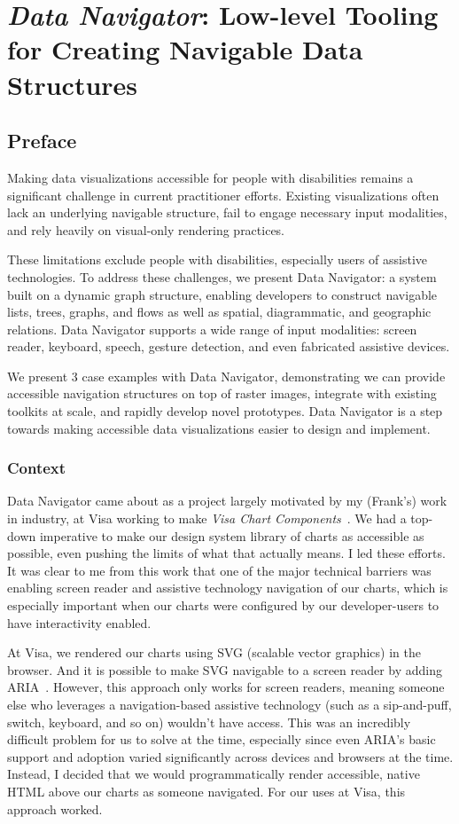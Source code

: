 \documentclass[12pt]{cmuthesis}
\begin{document}
\chapter{\textit{Data Navigator}: Low-level Tooling for Creating Navigable Data Structures}

\section{Preface}

Making data visualizations accessible for people with disabilities remains a significant challenge in current practitioner efforts. Existing visualizations often lack an underlying navigable structure, fail to engage necessary input modalities, and rely heavily on visual-only rendering practices.

These limitations exclude people with disabilities, especially users of assistive technologies. To address these challenges, we present Data Navigator: a system built on a dynamic graph structure, enabling developers to construct navigable lists, trees, graphs, and flows as well as spatial, diagrammatic, and geographic relations. Data Navigator supports a wide range of input modalities: screen reader, keyboard, speech, gesture detection, and even fabricated assistive devices.

We present 3 case examples with Data Navigator, demonstrating we can provide accessible navigation structures on top of raster images, integrate with existing toolkits at scale, and rapidly develop novel prototypes. Data Navigator is a step towards making accessible data visualizations easier to design and implement.

\subsection{Context}
Data Navigator came about as a project largely motivated by my (Frank's) work in industry, at Visa working to make \textit{Visa Chart Components}~\cite{VisaVisa}. We had a top-down imperative to make our design system library of charts as accessible as possible, even pushing the limits of what that actually means. I led these efforts. It was clear to me from this work that one of the major technical barriers was enabling screen reader and assistive technology navigation of our charts, which is especially important when our charts were configured by our developer-users to have interactivity enabled.

At Visa, we rendered our charts using SVG (scalable vector graphics) in the browser. And it is possible to make SVG navigable to a screen reader by adding ARIA~\cite{WAI2017ARIA}. However, this approach only works for screen readers, meaning someone else who leverages a navigation-based assistive technology (such as a sip-and-puff, switch, keyboard, and so on) wouldn't have access. This was an incredibly difficult problem for us to solve at the time, especially since even ARIA's basic support and adoption varied significantly across devices and browsers at the time. Instead, I decided that we would programmatically render accessible, native HTML above our charts as someone navigated. For our uses at Visa, this approach worked.
\end{document}
